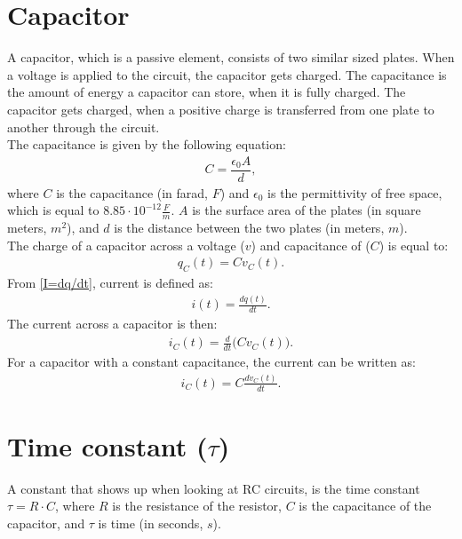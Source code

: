 \section{Capacitor}
A capacitor, which is a passive element, consists of two similar sized plates. When a voltage is applied to the circuit, the capacitor gets charged. The capacitance is the amount of energy a capacitor can store, when it is fully charged. The capacitor gets charged, when a positive charge is transferred from one plate to another through the circuit.
\\
The capacitance is given by the following equation:
\begin{align*}
C=\dfrac{\epsilon_{0}A}{d},
\end{align*}
where $C$ is the capacitance (in farad, $F$) and $\epsilon_{0}$ is the permittivity of free space, which is equal to $8.85 \cdot 10^{-12}                                                 \frac{F}{m}$. $A$ is the surface area of the plates (in square meters, $m^{2}$), and $d$ is the distance between the two plates (in meters, $m$).
\\
The charge of a capacitor across a voltage ($v$) and capacitance of ($C$) is equal to:
\begin{align}
\label{QCV}
q_C(t) = Cv_C(t).	
\end{align}
From \eqref{I=dq/dt}, current is defined as:
\begin{align*}
	i(t) = \frac{dq(t)}{dt}.
\end{align*}
The current across a capacitor is then:
\begin{align*}
	i_C(t) = \frac{d}{dt}\big(Cv_C(t)\big).
\end{align*}
For a capacitor with a constant capacitance, the current can be written as:
\begin{align}
	i_C(t) = C\frac{dv_C(t)}{dt}.\label{iC}
\end{align}


\section{Time constant ($\tau$)}
A constant that shows up when looking at RC circuits, is the time constant $\tau = R \cdot C$, where $R$ is the resistance of the resistor, $C$ is the capacitance of the capacitor, and $\tau$ is time (in seconds, $s$).

